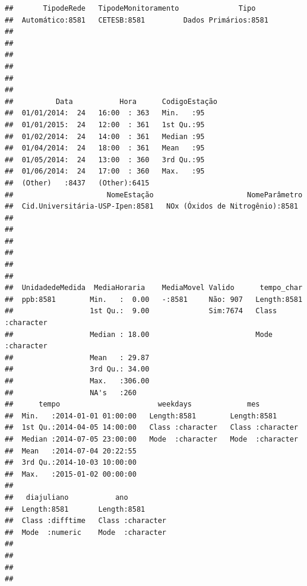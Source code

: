 \documentclass[]{book}
\begin{document}
\begin{verbatim}
##       TipodeRede   TipodeMonitoramento              Tipo     
##  Automático:8581   CETESB:8581         Dados Primários:8581  
##                                                              
##                                                              
##                                                              
##                                                              
##                                                              
##                                                              
##          Data           Hora      CodigoEstação
##  01/01/2014:  24   16:00  : 363   Min.   :95   
##  01/01/2015:  24   12:00  : 361   1st Qu.:95   
##  01/02/2014:  24   14:00  : 361   Median :95   
##  01/04/2014:  24   18:00  : 361   Mean   :95   
##  01/05/2014:  24   13:00  : 360   3rd Qu.:95   
##  01/06/2014:  24   17:00  : 360   Max.   :95   
##  (Other)   :8437   (Other):6415                
##                      NomeEstação                      NomeParâmetro 
##  Cid.Universitária-USP-Ipen:8581   NOx (Óxidos de Nitrogênio):8581  
##                                                                     
##                                                                     
##                                                                     
##                                                                     
##                                                                     
##                                                                     
##  UnidadedeMedida  MediaHoraria    MediaMovel Valido      tempo_char       
##  ppb:8581        Min.   :  0.00   -:8581     Não: 907   Length:8581       
##                  1st Qu.:  9.00              Sim:7674   Class :character  
##                  Median : 18.00                         Mode  :character  
##                  Mean   : 29.87                                           
##                  3rd Qu.: 34.00                                           
##                  Max.   :306.00                                           
##                  NA's   :260                                              
##      tempo                       weekdays             mes           
##  Min.   :2014-01-01 01:00:00   Length:8581        Length:8581       
##  1st Qu.:2014-04-05 14:00:00   Class :character   Class :character  
##  Median :2014-07-05 23:00:00   Mode  :character   Mode  :character  
##  Mean   :2014-07-04 20:22:55                                        
##  3rd Qu.:2014-10-03 10:00:00                                        
##  Max.   :2015-01-02 00:00:00                                        
##                                                                     
##   diajuliano           ano           
##  Length:8581       Length:8581       
##  Class :difftime   Class :character  
##  Mode  :numeric    Mode  :character  
##                                      
##                                      
##                                      
## 
\end{verbatim}
\end{document}
